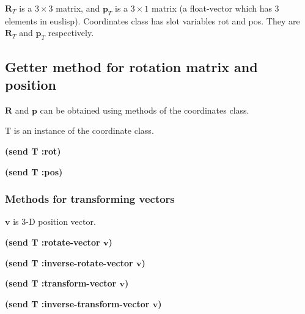 $\mathbf{R}_T$ is a $3\times3$ matrix, and $\mathbf{p}_T$ is a $3\times1$ matrix
(a float-vector which has 3 elements in euslisp).
Coordinates class has
slot variables rot and pos. They are $\mathbf{R}_T$ and $\mathbf{p}_T$ respectively.

\subsection*{Getter method for rotation matrix and position}

$\mathbf{R}$ and $\mathbf{p}$ can be obtained using methods of the coordinates class.

T is an instance of the coordinate class.

\begin{refdesc}

{\bf (send T :rot)}

{\bf (send T :pos)}

\end{refdesc}

\subsubsection*{Methods for transforming vectors}

$\mathbf{v}$ is 3-D position vector.

\begin{refdesc}

{\bf (send T :rotate-vector $\mathbf{v}$)}

{\bf (send T :inverse-rotate-vector $\mathbf{v}$)}

{\bf (send T :transform-vector $\mathbf{v}$)}

{\bf (send T :inverse-transform-vector $\mathbf{v}$)}

\end{refdesc}

